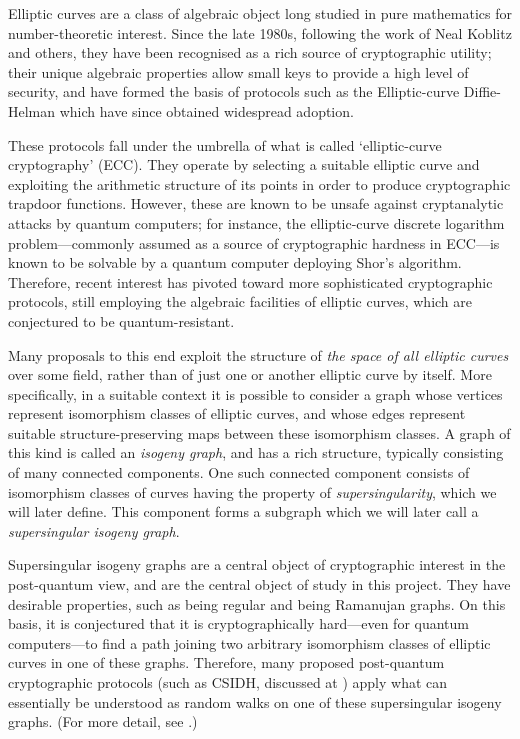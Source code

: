 
Elliptic curves are a class of algebraic object long studied in pure mathematics for number-theoretic interest. Since the late 1980s, following the work of Neal Koblitz \cite{koblitz} and others, they have been recognised as a rich source of cryptographic utility; their unique algebraic properties allow small keys to provide a high level of security, and have formed the basis of protocols such as the Elliptic-curve Diffie-Helman which have since obtained widespread adoption. 

These protocols fall under the umbrella of what is called `elliptic-curve cryptography' (ECC). They operate by selecting a suitable elliptic curve and exploiting the arithmetic structure of its points in order to produce cryptographic trapdoor functions. However, these are known to be unsafe against cryptanalytic attacks by quantum computers; for instance, the elliptic-curve discrete logarithm problem---commonly assumed as a source of cryptographic hardness in ECC---is known to be solvable by a quantum computer deploying Shor's algorithm. Therefore, recent interest has pivoted toward more sophisticated cryptographic protocols, still employing the algebraic facilities of elliptic curves, which are conjectured to be quantum-resistant. 

Many proposals to this end exploit the structure of \textit{the space of all elliptic curves} over some field, rather than of just one or another elliptic curve by itself. More specifically, in a suitable context it is possible to consider a graph whose vertices represent isomorphism classes of elliptic curves, and whose edges represent suitable structure-preserving maps between these isomorphism classes. A graph of this kind is called an \textit{isogeny graph}, and has a rich structure, typically consisting of many connected components. One such connected component consists of isomorphism classes of curves having the property of \textit{supersingularity}, which we will later define. This component forms a subgraph which we will later call a \textit{supersingular isogeny graph}.

Supersingular isogeny graphs are a central object of cryptographic interest in the post-quantum view, and are the central object of study in this project. They have desirable properties, such as being regular and being Ramanujan graphs. On this basis, it is conjectured that it is cryptographically hard---even for quantum computers---to find a path joining two arbitrary isomorphism classes of elliptic curves in one of these graphs. Therefore, many proposed post-quantum cryptographic protocols (such as CSIDH, discussed at \cite{CSIDH}) apply what can essentially be understood as random walks on one of these supersingular isogeny graphs. (For more detail, see \cite{de_feo2017}.)

